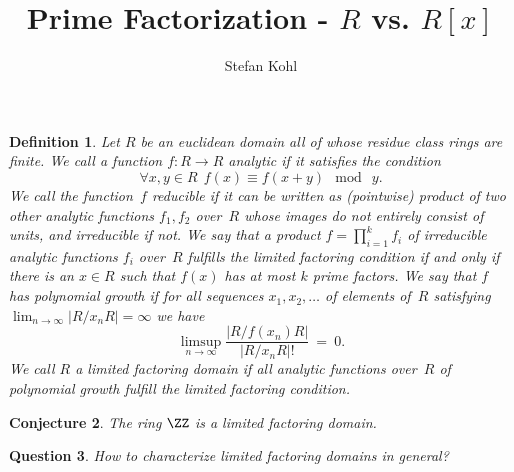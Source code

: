 \documentclass[12pt]{article}
\theoremstyle{change}
\newtheorem{Definition}{Definition}
\newtheorem{Conjecture}[Definition]{Conjecture}
\newtheorem{Question}[Definition]{Question}
\begin{document}
\title{Prime Factorization - \(R\) vs. \(R[x]\)}
\author{Stefan Kohl} \date{}
\maketitle

  \begin{Definition}
    Let \(R\) be an euclidean domain all of whose residue class rings are finite.
    We call a function \(f: R \rightarrow R\) \emph{analytic} if it satisfies the condition
    \[
      \forall x,y \in R \ \ f(x) \equiv f(x + y) \!\! \mod \ y.
    \]
    We call the function~\(f\) \emph{reducible} if it can be written as (pointwise) product of
    two other analytic functions \(f_1, f_2\) over~\(R\) whose images do not entirely consist
    of units, and \emph{irreducible} if not.
    We say that a product \(f = \prod_{i=1}^k f_i\) of irreducible analytic functions \(f_i\) 
    over~\(R\) fulfills the \emph{limited factoring condition} if and only if there is an
    \(x \in R\) such that \(f(x)\) has at most \(k\) prime factors.
    We say that \(f\) has \emph{polynomial growth} if for all sequences \(x_1, x_2, \dots\) of
    elements of~\(R\) satisfying \(\lim_{n \rightarrow \infty} |R/x_nR| = \infty\) we have
    \[
      \limsup_{n \rightarrow \infty} \frac{|R/f(x_n)R|}{|R/x_nR|!} \ = \ 0.
    \]
    We call \(R\) a \emph{limited factoring domain} if all analytic functions over~\(R\) of
    polynomial growth fulfill the limited factoring condition.
  \end{Definition}

  \begin{Conjecture}
    The ring \(\ZZ\) is a limited factoring domain.
  \end{Conjecture}

  \begin{Question}
    How to characterize limited factoring domains in general?
  \end{Question}
\end{document}
